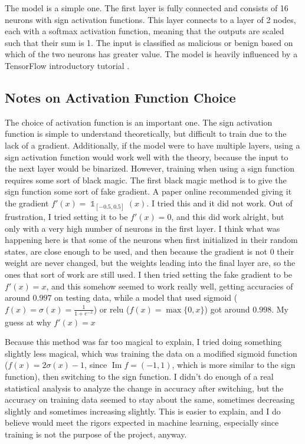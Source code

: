 \documentclass{article}
\DeclareMathOperator{\im}{Im}
\DeclareMathOperator{\1}{\mathbb{1}}
\begin{document}
The model is a simple one. The first layer is fully connected and consists of 16 neurons with sign activation functions. This layer connects to a layer of 2 nodes, each with a softmax activation function, meaning that the outputs are scaled such that their sum is 1. The input is classified as malicious or benign based on which of the two neurons has greater value. The model is heavily influenced by a TensorFlow introductory tutorial \cite{tftut}.

\subsection{Notes on Activation Function Choice}

The choice of activation function is an important one. The sign activation function is simple to understand theoretically, but difficult to train due to the lack of a gradient. Additionally, if the model were to have multiple layers, using a sign activation function would work well with the theory, because the input to the next layer would be binarized. However, training when using a sign function requires some sort of black magic. The first black magic method is to give the sign function some sort of fake gradient. A paper online recommended giving it the gradient $f'(x) = \1_{[-0.5, 0.5]}(x)$. I tried this and it did not work. Out of frustration, I tried setting it to be $f'(x) = 0$, and this did work alright, but only with a very high number of neurons in the first layer. I think what was happening here is that some of the neurons when first initialized in their random states, are close enough to be used, and then because the gradient is not 0 their weight are never changed, but the weights leading into the final layer are, so the ones that sort of work are still used. I then tried setting the fake gradient to be $f'(x) = x$, and this somehow seemed to work really well, getting accuracies of around $0.997$ on testing data, while a model that used sigmoid ($f(x) = \sigma(x) = \frac{1}{1 + e^{-x}}$) or relu ($f(x) = \max\{0, x\}$) got around $0.998$. My guess at why $f'(x) = x$

Because this method was far too magical to explain, I tried doing something slightly less magical, which was training the data on a modified sigmoid function ($f(x) = 2\sigma(x) - 1$, since $\im f = (-1, 1)$, which is more similar to the sign function), then switching to the sign function. I didn't do enough of a real statistical analysis to analyze the change in accuracy after switching, but the accuracy on training data seemed to stay about the same, sometimes decreasing slightly and sometimes increasing slightly. This is easier to explain, and I do believe would meet the rigors expected in machine learning, especially since training is not the purpose of the project, anyway.
\end{document}
